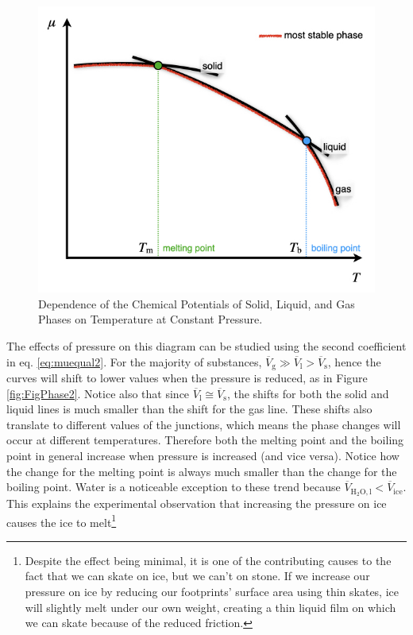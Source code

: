 \documentclass[
  9pt,
]{extbook}
\theoremstyle{definition}
\theoremstyle{definition}
\theoremstyle{definition}
\theoremstyle{remark}
\begin{document}
\begin{figure}

{\centering \includegraphics[width=0.6\linewidth]{./img/OEP_Figures.016} 

}

\caption{Dependence of the Chemical Potentials of Solid, Liquid, and Gas Phases on Temperature at Constant Pressure.}\label{fig:FigPhase1}
\end{figure}

The effects of pressure on this diagram can be studied using the second coefficient in eq. \eqref{eq:muequal2}. For the majority of substances, \(\overline{V}_{\text{g}} \gg \overline{V}_{\text{l}} > \overline{V}_{\text{s}}\), hence the curves will shift to lower values when the pressure is reduced, as in Figure \ref{fig:FigPhase2}. Notice also that since \(\overline{V}_{\text{l}} \cong \overline{V}_{\text{s}}\), the shifts for both the solid and liquid lines is much smaller than the shift for the gas line. These shifts also translate to different values of the junctions, which means the phase changes will occur at different temperatures. Therefore both the melting point and the boiling point in general increase when pressure is increased (and vice versa). Notice how the change for the melting point is always much smaller than the change for the boiling point.
Water is a noticeable exception to these trend because \(\overline{V}_{\mathrm{H}_2\mathrm{O,l}} < \overline{V}_{\text{ice}}\). This explains the experimental observation that increasing the pressure on ice causes the ice to melt\footnote{Despite the effect being minimal, it is one of the contributing causes to the fact that we can skate on ice, but we can't on stone. If we increase our pressure on ice by reducing our footprints' surface area using thin skates, ice will slightly melt under our own weight, creating a thin liquid film on which we can skate because of the reduced friction.}
\end{document}
